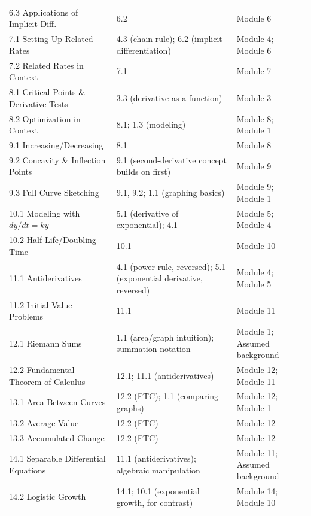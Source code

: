 \documentclass{article}
\begin{document}
\begin{longtable}{p{4.3cm} p{6.2cm} p{4cm}}
6.3 Applications of Implicit Diff. & 6.2 & Module 6 \\
7.1 Setting Up Related Rates & 4.3 (chain rule); 6.2 (implicit differentiation) & Module 4; Module 6 \\
7.2 Related Rates in Context & 7.1 & Module 7 \\
8.1 Critical Points \& Derivative Tests & 3.3 (derivative as a function) & Module 3 \\
8.2 Optimization in Context & 8.1; 1.3 (modeling) & Module 8; Module 1 \\
9.1 Increasing/Decreasing & 8.1 & Module 8 \\
9.2 Concavity \& Inflection Points & 9.1 (second-derivative concept builds on first) & Module 9 \\
9.3 Full Curve Sketching & 9.1, 9.2; 1.1 (graphing basics) & Module 9; Module 1 \\
10.1 Modeling with $dy/dt=ky$ & 5.1 (derivative of exponential); 4.1 & Module 5; Module 4 \\
10.2 Half-Life/Doubling Time & 10.1 & Module 10 \\
11.1 Antiderivatives & 4.1 (power rule, reversed); 5.1 (exponential derivative, reversed) & Module 4; Module 5 \\
11.2 Initial Value Problems & 11.1 & Module 11 \\
12.1 Riemann Sums & 1.1 (area/graph intuition); summation notation & Module 1; Assumed background \\
12.2 Fundamental Theorem of Calculus & 12.1; 11.1 (antiderivatives) & Module 12; Module 11 \\
13.1 Area Between Curves & 12.2 (FTC); 1.1 (comparing graphs) & Module 12; Module 1 \\
13.2 Average Value & 12.2 (FTC) & Module 12 \\
13.3 Accumulated Change & 12.2 (FTC) & Module 12 \\
14.1 Separable Differential Equations & 11.1 (antiderivatives); algebraic manipulation & Module 11; Assumed background \\
14.2 Logistic Growth & 14.1; 10.1 (exponential growth, for contrast) & Module 14; Module 10 \\
\end{longtable}
\end{document}
